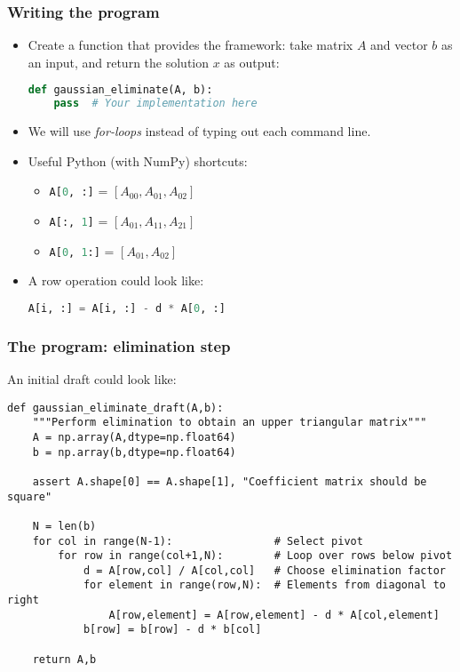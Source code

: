\begin{frame}[fragile]
  \frametitle{Writing the program}
  \begin{itemize}
   \item Create a function that provides the framework: take matrix $A$ and vector $b$ as an input, and return the solution $x$ as output:
  \begin{lstlisting}[language=Python]
def gaussian_eliminate(A, b):
    pass  # Your implementation here
  \end{lstlisting}
  \item We will use \emph{for-loops} instead of typing out each command line.
  \item Useful Python (with NumPy) shortcuts:
  \begin{itemize}
  \item \lstinline[language=Python]$A[0, :]$   = $[A_{00}, A_{01}, A_{02}]$
  \item \lstinline[language=Python]$A[:, 1]$   = $[A_{01}, A_{11}, A_{21}]$
  \item \lstinline[language=Python]$A[0, 1:]$ = $[A_{01}, A_{02}]$
  \end{itemize}
  \item A row operation could look like:
  \begin{lstlisting}[language=Python]
A[i, :] = A[i, :] - d * A[0, :]   
  \end{lstlisting}
  \end{itemize}
\end{frame}


\begin{frame}[fragile]
  \frametitle{The program: elimination step}
  An initial draft could look like:
  \begin{lstlisting}
def gaussian_eliminate_draft(A,b):
    """Perform elimination to obtain an upper triangular matrix"""
    A = np.array(A,dtype=np.float64)
    b = np.array(b,dtype=np.float64)

    assert A.shape[0] == A.shape[1], "Coefficient matrix should be square"

    N = len(b)
    for col in range(N-1):                # Select pivot
        for row in range(col+1,N):        # Loop over rows below pivot
            d = A[row,col] / A[col,col]   # Choose elimination factor
            for element in range(row,N):  # Elements from diagonal to right
                A[row,element] = A[row,element] - d * A[col,element]
            b[row] = b[row] - d * b[col]

    return A,b
  \end{lstlisting}
\end{frame}

